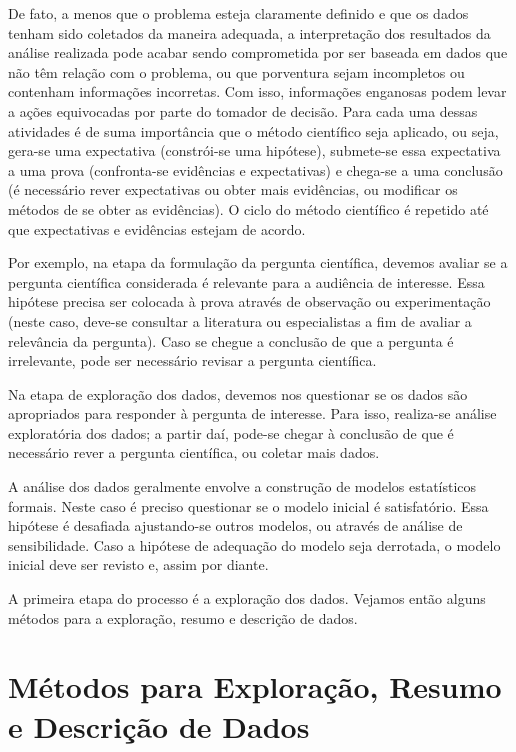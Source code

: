 \documentclass[
]{book}
\theoremstyle{definition}
\theoremstyle{definition}
\theoremstyle{definition}
\theoremstyle{remark}
\begin{document}
De fato, a menos que o problema esteja claramente definido e que os dados tenham sido coletados da maneira adequada, a interpretação dos resultados da análise realizada pode acabar sendo comprometida por ser baseada em dados que não têm relação com o problema, ou que porventura sejam incompletos ou contenham informações incorretas. Com isso, informações enganosas podem levar a ações equivocadas por parte do tomador de decisão. Para cada uma dessas atividades é de suma importância que o método científico seja aplicado, ou seja, gera-se uma expectativa (constrói-se uma hipótese), submete-se essa expectativa a uma prova (confronta-se evidências e expectativas) e chega-se a uma conclusão (é necessário rever expectativas ou obter mais evidências, ou modificar os métodos de se obter as evidências). O ciclo do método científico é repetido até que expectativas e evidências estejam de acordo.

Por exemplo, na etapa da formulação da pergunta científica, devemos avaliar se a pergunta científica considerada é relevante para a audiência de interesse. Essa hipótese precisa ser colocada à prova através de observação ou experimentação (neste caso, deve-se consultar a literatura ou especialistas a fim de avaliar a relevância da pergunta). Caso se chegue a conclusão de que a pergunta é irrelevante, pode ser necessário revisar a pergunta científica.

Na etapa de exploração dos dados, devemos nos questionar se os dados são apropriados para responder à pergunta de interesse. Para isso, realiza-se análise exploratória dos dados; a partir daí, pode-se chegar à conclusão de que é necessário rever a pergunta científica, ou coletar mais dados.

A análise dos dados geralmente envolve a construção de modelos estatísticos formais. Neste caso é preciso questionar se o modelo inicial é satisfatório. Essa hipótese é desafiada ajustando-se outros modelos, ou através de análise de sensibilidade. Caso a hipótese de adequação do modelo seja derrotada, o modelo inicial deve ser revisto e, assim por diante.

A primeira etapa do processo é a exploração dos dados. Vejamos então alguns métodos para a exploração, resumo e descrição de dados.

\hypertarget{muxe9todos-para-explorauxe7uxe3o-resumo-e-descriuxe7uxe3o-de-dados}{%
\section{Métodos para Exploração, Resumo e Descrição de Dados}\label{muxe9todos-para-explorauxe7uxe3o-resumo-e-descriuxe7uxe3o-de-dados}}
\end{document}
